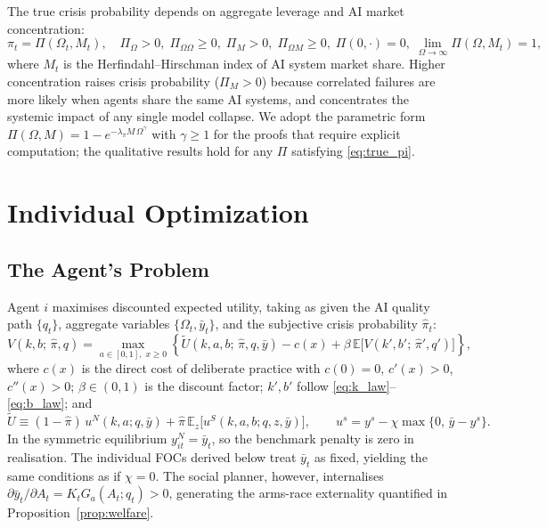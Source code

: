\documentclass[12pt]{article}
\newcommand{\E}{\mathbb{E}}
\newcommand{\hpi}{\hat{\pi}}
\begin{document}
The true crisis probability depends on aggregate leverage and AI market concentration:
\begin{equation}
\pi_t = \Pi(\Omega_t, M_t), \quad \Pi_\Omega > 0,\; \Pi_{\Omega\Omega} \geq 0,\;
\Pi_M > 0,\; \Pi_{\Omega M} \geq 0,\; \Pi(0,\cdot) = 0,\;
\lim_{\Omega \to \infty}\Pi(\Omega,M_t)=1,
\label{eq:true_pi}
\end{equation}
where $M_t$ is the Herfindahl--Hirschman index of AI system market share.
Higher concentration raises crisis probability ($\Pi_M > 0$) because correlated
failures are more likely when agents share the same AI systems, and concentrates
the systemic impact of any single model collapse.
We adopt the parametric form $\Pi(\Omega,M) = 1 - e^{-\lambda_\pi M\,\Omega^\gamma}$
with $\gamma \geq 1$ for the proofs that require explicit computation; the qualitative
results hold for any $\Pi$ satisfying \eqref{eq:true_pi}.

\section{Individual Optimization}
\label{sec:individual}

\subsection{The Agent's Problem}

Agent $i$ maximises discounted expected utility, taking as given the AI quality path
$\{q_t\}$, aggregate variables $\{\Omega_t, \bar{y}_t\}$, and the subjective crisis
probability $\hpi_t$:
\begin{equation}
V(k, b;\, \hpi, q) = \max_{a \in [0,1],\; x \geq 0} \left\{
\tilde{U}(k,a,b;\,\hpi,q,\bar{y})
- c(x) + \beta\, \E\bigl[V(k', b';\, \hpi', q')\bigr]
\right\},
\label{eq:bellman}
\end{equation}
where $c(x)$ is the direct cost of deliberate practice with $c(0) = 0$, $c'(x) > 0$,
$c''(x) > 0$; $\beta \in (0,1)$ is the discount factor; $k', b'$ follow
\eqref{eq:k_law}--\eqref{eq:b_law}; and
\[
\tilde{U} \equiv (1-\hpi)\,u^N(k,a;q,\bar{y}) + \hpi\,\E_z\bigl[u^S(k,a,b;q,z,\bar{y})\bigr],
\qquad u^s = y^s - \chi\max\bigl\{0,\,\bar{y} - y^s\bigr\}.
\]
In the symmetric equilibrium $y^N_{it} = \bar{y}_t$, so the benchmark penalty is
zero in realisation. The individual FOCs derived below treat $\bar{y}_t$ as fixed,
yielding the same conditions as if $\chi=0$. The social planner, however, internalises
$\partial\bar{y}_t/\partial A_t = K_t G_a(A_t;q_t) > 0$, generating the arms-race
externality quantified in Proposition~\ref{prop:welfare}.
\end{document}
